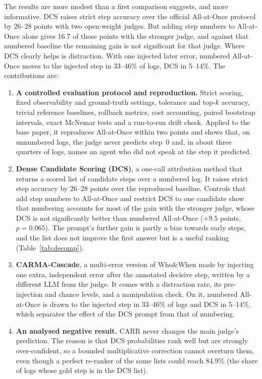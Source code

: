\documentclass[conference]{IEEEtran}
\begin{document}
The results are more modest than a first comparison suggests, and more informative. DCS raises strict step accuracy over the official All-at-Once protocol by 26--28 points with two open-weight judges. But adding step numbers to All-at-Once alone gives 16.7 of those points with the stronger judge, and against that numbered baseline the remaining gain is not significant for that judge. Where DCS clearly helps is distraction. With one injected later error, numbered All-at-Once moves to the injected step in 33--46\% of logs, DCS in 5--14\%. The contributions are:
\begin{enumerate}
\item \textbf{A controlled evaluation protocol and reproduction.} Strict scoring, fixed observability and ground-truth settings, tolerance and top-$k$ accuracy, trivial reference baselines, rollback metrics, cost accounting, paired bootstrap intervals, exact McNemar tests and a run-to-run drift check. Applied to the base paper, it reproduces All-at-Once within two points and shows that, on unnumbered logs, the judge never predicts step~0 and, in about three quarters of logs, names an agent who did not speak at the step it predicted.
\item \textbf{Dense Candidate Scoring (DCS)}, a one-call attribution method that returns a scored list of candidate steps over a numbered log. It raises strict step accuracy by 26--28 points over the reproduced baseline. Controls that add step numbers to All-at-Once and restrict DCS to one candidate show that numbering accounts for most of the gain with the stronger judge, whose DCS is not significantly better than numbered All-at-Once ($+9.5$ points, $p=0.065$). The prompt's further gain is partly a bias towards early steps, and the list does not improve the first answer but is a useful ranking (Table~\ref{tab:decomp}).
\item \textbf{CARMA-Cascade}, a multi-error version of Who\&When made by injecting one extra, independent error after the annotated decisive step, written by a different LLM from the judge. It comes with a distraction rate, its pre-injection and chance levels, and a manipulation check. On it, numbered All-at-Once is drawn to the injected step in 33--46\% of logs and DCS in 5--14\%, which separates the effect of the DCS prompt from that of numbering.
\item \textbf{An analysed negative result.} CARR never changes the main judge's prediction. The reason is that DCS probabilities rank well but are strongly over-confident, so a bounded multiplicative correction cannot overturn them, even though a perfect re-ranker of the same lists could reach 84.9\% (the share of logs whose gold step is in the DCS list).
\end{enumerate}
\end{document}
